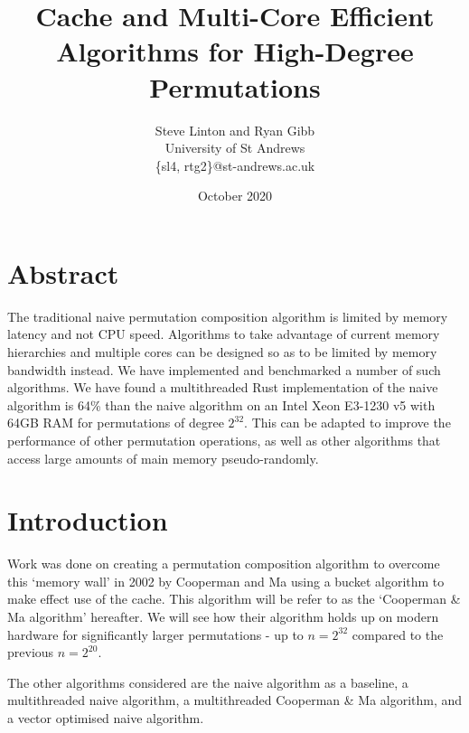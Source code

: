 \documentclass{article}
\title{Cache and Multi-Core Efficient Algorithms for High-Degree Permutations}
\author{
    Steve Linton and Ryan Gibb\\
    University of St Andrews\\
    \{sl4, rtg2\}@st-andrews.ac.uk\\
    }
\date{October 2020}
\begin{document}
\maketitle

\section*{Abstract}


The traditional naive permutation composition algorithm is limited by memory latency and not CPU speed. Algorithms to take advantage of current memory hierarchies and multiple cores can be designed so as to be limited by memory bandwidth instead. We have implemented and benchmarked a number of such algorithms. We have found a multithreaded Rust implementation of the naive algorithm is 64\% than the naive algorithm on an Intel Xeon E3-1230 v5 with 64GB RAM for permutations of degree $2^{32}$. This can be adapted to improve the performance of other permutation operations, as well as other algorithms that access large amounts of main memory pseudo-randomly.



\section{Introduction}


Work was done on creating a permutation composition algorithm to overcome this `memory wall' in 2002 by Cooperman and Ma using a bucket algorithm to make effect use of the cache.\cite{Cooperman2002OvercomingTM} This algorithm will be refer to as the `Cooperman \& Ma algorithm' hereafter. We will see how their algorithm holds up on modern hardware for significantly larger permutations  - up to $n=2^{32}$ compared to the previous $n=2^{20}$.

The other algorithms considered are the naive algorithm as a baseline, a multithreaded naive algorithm, a multithreaded Cooperman \& Ma algorithm, and a vector optimised naive algorithm.
\end{document}
